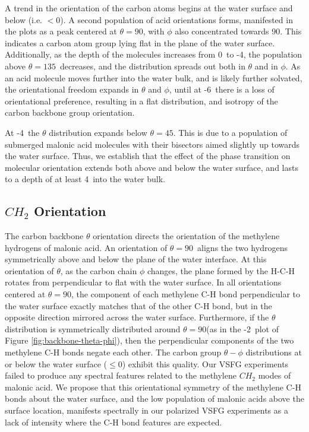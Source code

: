 A trend in the orientation of the carbon atoms begins at the water surface and below (i.e. $<0$\angs). A second population of acid orientations forms, manifested in the plots as a peak centered at $\theta=90$\textdegree, with $\phi$ also concentrated towards 90\textdegree. This indicates a carbon atom group lying flat in the plane of the water surface. Additionally, as the depth of the molecules increases from 0\angs~to -4\angs, the population above $\theta=135$\textdegree~decreases, and the distribution spreads out both in $\theta$ and in $\phi$. As an acid molecule moves further into the water bulk, and is likely further solvated, the orientational freedom expands in $\theta$ and $\phi$, until at -6\angs~there is a loss of orientational preference, resulting in a flat distribution, and isotropy of the carbon backbone group orientation.

At -4\angs~the $\theta$ distribution expands below $\theta=45$\textdegree. This is due to a population of submerged malonic acid molecules with their bisectors aimed slightly up towards the water surface. Thus, we establish that the effect of the phase transition on molecular orientation extends both above and below the water surface, and lasts to a depth of at least 4\angs~into the water bulk.


\subsection {$CH_2$ Orientation}

The carbon backbone $\theta$ orientation directs the orientation of the methylene hydrogens of malonic acid. An orientation of $\theta=90$\textdegree~aligns the two hydrogens symmetrically above and below the plane of the water interface. At this orientation of $\theta$, as the carbon chain $\phi$ changes, the plane formed by the H-C-H rotates from perpendicular to flat with the water surface. In all orientations centered at $\theta=90$\textdegree, the component of each methylene C-H bond perpendicular to the water surface exactly matches that of the other C-H bond, but in the opposite direction mirrored across the water surface. Furthermore, if the $\theta$ distribution is symmetrically distributed around $\theta=90$\textdegree (as in the -2\angs~plot of Figure \ref{fig:backbone-theta-phi}), then the perpendicular components of the two methylene C-H bonds negate each other. The carbon group $\theta-\phi$ distributions at or below the water surface ($\le 0$\angs) exhibit this quality. Our VSFG experiments failed to produce any spectral features related to the methylene $CH_2$ modes of malonic acid. We propose that this orientational symmetry of the methylene C-H bonds about the water surface, and the low population of malonic acids above the surface location, manifests spectrally in our polarized VSFG experiments as a lack of intensity where the C-H bond features are expected. 

